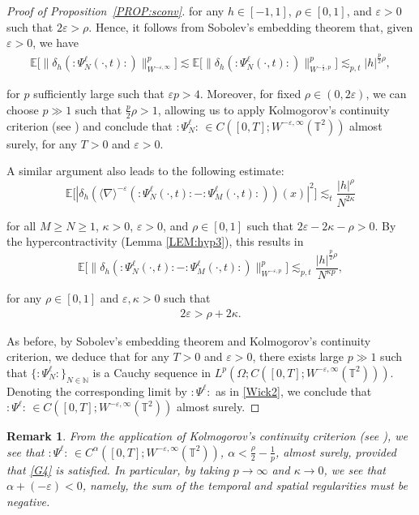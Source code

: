 \documentclass[letterpaper, 11pt,  reqno]{amsart}
\newtheorem{remark}[theorem]{Remark}
\newcommand{\1}{\hspace{0.5mm}\text{I}\hspace{0.5mm}}
\newcommand{\noi}{\noindent}
\newcommand{\T}{\mathbb{T}}
\newcommand{\E}{\mathbb{E}}
\newcommand{\al}{\alpha}
\newcommand{\dl}{\delta}
\newcommand{\nb}{\nabla}
\newcommand{\eps}{\varepsilon}
\renewcommand{\l}{\ell}
\newcommand{\les}{\lesssim}
\newcommand{\jb}[1]
{\langle #1 \rangle}
\numberwithin{equation}{section}
\numberwithin{theorem}{section}
\begin{document}
\begin{proof}[Proof of Proposition~\ref{PROP:sconv}]
\noi
for any $h \in [-1,1]$, $\rho \in [0,1]$, and $\eps>0$ such that $2\eps > \rho$.
Hence,  it follows from  Sobolev's embedding theorem that,
given $\eps > 0$, we have
\begin{align*}
 \E \Big[\big\| \delta_h (: \!\Psi^{\ell}_N (\cdot, t) \!:) 
\big\|_{W^{- \eps,\infty}}^p \Big]
\les 
 \E \Big[\big\| \delta_h (: \!\Psi^{\ell}_N (\cdot, t) \!:) 
\big\|_{W^{- \frac{\eps}{2},p}}^p \Big]
\les_{p, t} |h|^{\frac{p}{2}\rho}, 
\end{align*}

\noi
for $p$ sufficiently large such  that $\eps p > 4$.
Moreover, for fixed  $\rho \in (0, 2\eps)$, 
we can choose $p \gg1 $ such that $\frac p2 \rho > 1$,
allowing us to apply  Kolmogorov's continuity criterion (see \cite[Theorem 8.2]{Bass})
and conclude that 
$ :\!\Psi^\l_N \!:\,  \in C([0, T]; W^{-\eps, \infty}(\T^2))$
almost surely,  for any $T > 0$ and $\eps > 0$.


A similar argument also leads  to the following estimate:
\[ \E \big[| \dl_h (\jb{\nb}^{-\eps} (:\! \Psi^{\ell}_N (\cdot, t)\! :  -  :\! \Psi^{\ell}_M (\cdot, t) \!:)) (x) |^2 \big]
   \les_t  \frac{|h|^{\rho}}{N^{2\kappa}} \]


\noi
for all  $M\ge N \ge 1$, $\kappa >0$,  $\eps >0$,
and $\rho\in[0,1]$
 such that $2\eps - 2\kappa - \rho>0$.
By the hypercontractivity (Lemma \ref{LEM:hyp3}), 
this results in 
\[ \E \Big[\big\| \delta_h (: \!\Psi^{\ell}_N (\cdot, t) \!: - : \!\Psi^{\l}_M (\cdot, t) \!:) 
\big\|_{W^{- \eps,p}}^p \Big]
\les_{p, t} \frac{|h|^{\frac{p}{2}\rho}}{N^{\kappa p}}, \]

\noi
for any $\rho \in [0,1]$ and $\eps,\kappa >0$ such that 
\begin{align}
2\eps > \rho + 2\kappa.
\label{G4}
\end{align} 

\noi
As before, 
by Sobolev's embedding theorem
and 
Kolmogorov's continuity criterion, 
 we deduce that for any $T > 0$ and $\eps > 0$,
  there exists large $p\gg1$ such that 
$\{ :\!\Psi^\l_N \!:  \}_{N \in \mathbb{N}}$ 
is a Cauchy sequence in $L^p(\Omega;  C ([0, T] ; W^{- \eps,\infty}(\T^2)))$. 
Denoting  the corresponding limit
by $: \!\Psi^{\ell} \!:$ as in \eqref{Wick2}, 
we conclude that  $: \!\Psi^{\ell} \!:\, \in C ([0, T] ; W^{- \eps,\infty}(\T^2))$ almost surely.
\end{proof}


\begin{remark} \rm
From the application of Kolmogorov's continuity criterion (see \cite[Exercise 8.2]{Bass}), 
we see that 
$:\! \Psi^{\ell}\!\! : \, \in C^\al  ([0, T] ; W^{- \eps,\infty}(\T^2))$,
$\al < \frac{\rho}{2} - \frac 1p$,  almost surely,
provided that \eqref{G4} is satisfied.
In particular,  by taking $p \to \infty$ and $\kappa \to 0$, 
we see that $\al + (- \eps) < 0$,
namely, the sum of the temporal and spatial regularities must be negative.


\end{remark}
\end{document}
